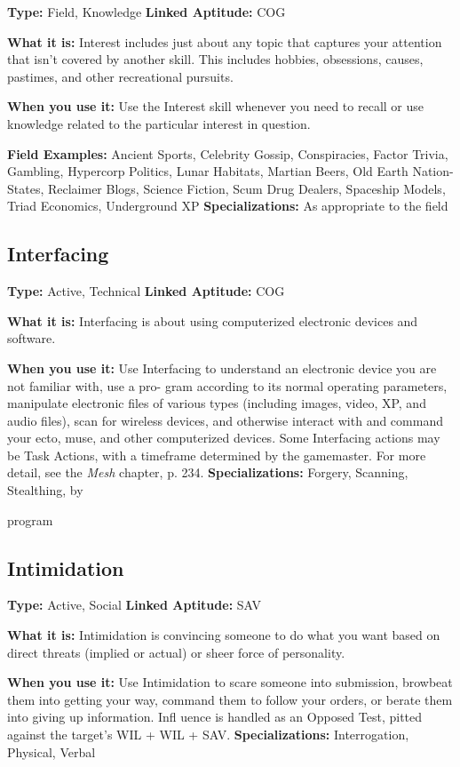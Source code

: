 \textbf{Type:} Field, Knowledge
\textbf{Linked Aptitude:} COG

\textbf{What it is:} Interest includes just about any topic 
that captures your attention that isn't covered by 
another skill. This includes hobbies, obsessions, 
causes, pastimes, and other recreational pursuits.

\textbf{When you use it:} Use the Interest skill whenever 
you need to recall or use knowledge related to the 
particular interest in question.

\textbf{Field Examples:} Ancient Sports, Celebrity Gossip, 
Conspiracies, Factor Trivia, Gambling, Hypercorp 
Politics, Lunar Habitats, Martian Beers, Old Earth 
Nation-States, Reclaimer Blogs, Science Fiction, Scum 
Drug Dealers, Spaceship Models, Triad Economics, 
Underground XP
\textbf{Specializations:} As appropriate to the field

\subsection{Interfacing}

\textbf{Type:} Active, Technical
\textbf{Linked Aptitude:} COG

\textbf{What it is:} Interfacing is about using computerized 
electronic devices and software.

\textbf{When you use it:} Use Interfacing to understand an 
electronic device you are not familiar with, use a pro-
gram according to its normal operating parameters, 
manipulate electronic files of various types (including 
images, video, XP, and audio files), scan for wireless 
devices, and otherwise interact with and command 
your ecto, muse, and other computerized devices. 
Some Interfacing actions may be Task Actions, with 
a timeframe determined by the gamemaster. For more 
detail, see the \textit{Mesh} chapter, p. 234.
\textbf{Specializations:} Forgery, Scanning, Stealthing, by 

program

\subsection{Intimidation}

\textbf{Type:} Active, Social
\textbf{Linked Aptitude:} SAV

\textbf{What it is:} Intimidation is convincing someone to 
do what you want based on direct threats (implied or 
actual) or sheer force of personality.

\textbf{When you use it:} Use Intimidation to scare someone 
into submission, browbeat them into getting your way, 
command them to follow your orders, or berate them 
into giving up information. Infl uence is handled as an 
Opposed Test, pitted against the target's WIL + WIL 
+ SAV.
\textbf{Specializations:} Interrogation, Physical, Verbal

